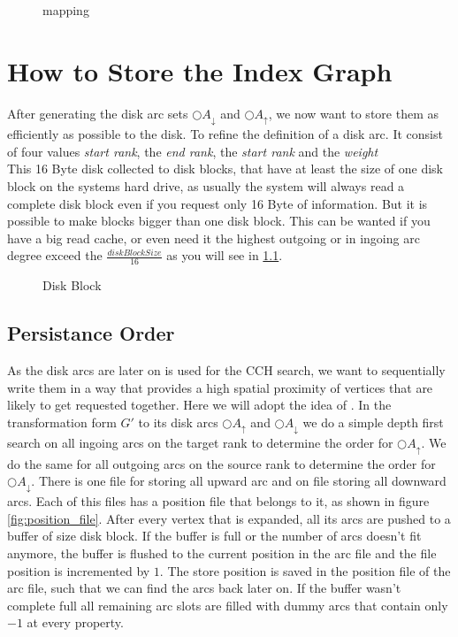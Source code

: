 \begin{figure}
    \centering
    
    \caption{mapping}
    \label{fig:mapping}
\end{figure}

\section{How to Store the Index Graph}

After generating the disk arc sets $\bigcirc A_\downarrow$ and $\bigcirc A_\uparrow$, we now want to store them as efficiently as possible to the disk. To refine the definition of a disk arc. It consist of four values \textit{start rank}, the \textit{end rank}, the \textit{start rank} and the \textit{weight} 
\\
This 16 Byte disk collected to disk blocks, that have at least the size of one disk block on the systems hard drive, as usually the system will always read a complete disk block even if you request only 16 Byte of information. But it is possible to make blocks bigger than one disk block. This can be wanted if you have a big read cache,
or even need it the highest outgoing or in ingoing arc degree exceed the $\frac{diskBlockSize}{16}$ as you will see in \ref{sec:persistanceOrder}.

\begin{figure}
    \centering
    
    \caption{Disk Block}
    \label{fig:disk_block}
\end{figure}

\subsection{Persistance Order}\label{sec:persistanceOrder}

As the disk arcs are later on is used for the CCH search, we want to sequentially write them in a way that provides a high spatial proximity of vertices that are likely to get requested together. Here we will adopt the idea of \cite[Mobile Route Planning]{Sanders}. In the transformation form $G'$ to its disk arcs $\bigcirc A_\uparrow$ 
and $\bigcirc A_\downarrow$ we do a simple depth first search on all ingoing arcs on the target rank to determine the order for $\bigcirc A_\uparrow$. We do the same for all outgoing arcs on the source rank to determine the order for $\bigcirc A_\downarrow$.
There is one file for storing all upward arc and on file storing all downward arcs. Each of this files has a position file that belongs to it, as shown in figure \ref{fig:position_file}. After every vertex that is expanded, all its arcs are pushed to a buffer of size disk block. If the buffer is full or the number of arcs doesn't fit anymore,
the buffer is flushed to the current position in the arc file and the file position is incremented by $1$. The store position is saved in the position file of the arc file, such that we can find the arcs back later on. If the buffer wasn't complete full all remaining arc slots are filled with dummy arcs that contain only $-1$ at every property.


